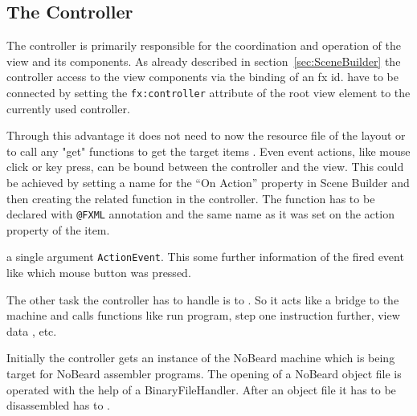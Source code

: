 \subsection{The Controller}
The controller is primarily responsible for the coordination and operation of the view and its components. As already described in section~\ref{sec:SceneBuilder} the controller  access to the view components via the binding of an fx id.  have to be connected  by setting the \lstinline$fx:controller$ attribute of the root view element to the currently used controller.

Through this advantage it does not need to now the resource file of the layout or to call any "get" functions to get the target items . Even event actions, like mouse click or key press, can be bound between the controller and the view. This could be achieved by setting a name for the ``On Action'' property in Scene Builder and then creating the related function in the controller. The function has to be declared with  \lstinline$@FXML$ annotation and the same name as it was set on the action property of the item.

 a single argument  \lstinline$ActionEvent$. This  some further information of the fired event like which mouse button was pressed.

The other  task  the controller has to handle is to  . So it acts like a bridge to the machine and calls functions like  run program, step one instruction further, view data , etc.

Initially the controller gets an instance of the NoBeard machine which is being target for NoBeard assembler programs. The opening of a NoBeard object file is operated with the help of a BinaryFileHandler. After an  object file it has to be disassembled  has to .

